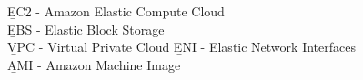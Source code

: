 \b{EC2} - Amazon Elastic Compute Cloud \\
\b{EBS} - Elastic Block Storage \\
\b{VPC} - Virtual Private Cloud
\b{ENI} - Elastic Network Interfaces \\
\b{AMI} - Amazon Machine Image
